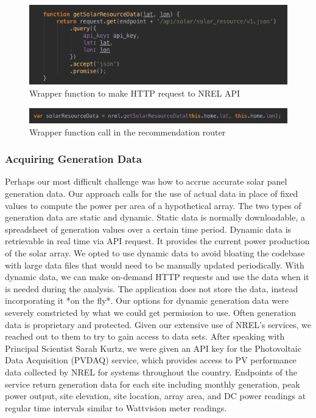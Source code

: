 \documentclass[pageno]{jpaper}
\begin{document}
\begin{figure}[h]
\begin{center}
\includegraphics[scale=0.6] {nrel-wrapper}
\caption{Wrapper function to make HTTP request to NREL API}
\label{fig:nrel-wrapper}
\end{center}
\end{figure}

\begin{figure}[h]
\begin{center}
\includegraphics[scale=0.6] {nrel-call}
\caption{Wrapper function call in the recommendation router}
\end{center}
\end{figure}


\subsubsection {Acquiring Generation Data}
Perhaps our most difficult challenge was how to accrue accurate solar panel generation data. Our approach calls for the use of actual data in place of fixed values to compute the power per area of a hypothetical array. The two types of generation data are static and dynamic. Static data is normally downloadable, a spreadsheet of generation values over a certain time period. Dynamic data is retrievable in real time via API request. It provides the current power production of the solar array. We opted to use dynamic data to avoid bloating the codebase with large data files that would need to be manually updated periodically. With dynamic data, we can make on-demand HTTP requests and use the data when it is needed during the analysis. The application does not store the data, instead incorporating it *on the fly*. Our options for dynamic generation data were severely constricted by what we could get permission to use. Often generation data is proprietary and protected. Given our extensive use of NREL's services, we reached out to them to try to gain access to data sets. After speaking with Principal Scientist Sarah Kurtz, we were given an API key for the Photovoltaic Data Acquisition (PVDAQ) service, which provides access to PV performance data collected by NREL for systems throughout the country. Endpoints of the service return generation data for each site including monthly generation, peak power output, site elevation, site location, array area, and DC power readings at regular time intervals similar to Wattvision meter readings.
\end{document}
